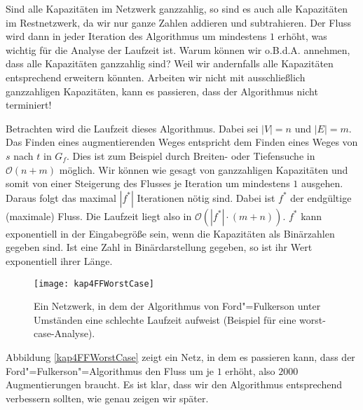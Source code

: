 Sind alle Kapazitäten im Netzwerk ganzzahlig, so sind es auch alle Kapazitäten im Restnetzwerk, da wir nur ganze Zahlen addieren und subtrahieren. Der Fluss wird dann in jeder Iteration des Algorithmus um mindestens $1$ erhöht, was wichtig für die Analyse der Laufzeit ist. Warum können wir o.B.d.A. annehmen, dass alle Kapazitäten ganzzahlig sind? Weil wir andernfalls alle Kapazitäten entsprechend erweitern könnten. Arbeiten wir nicht mit ausschließlich ganzzahligen Kapazitäten, kann es passieren, dass der Algorithmus nicht terminiert!

Betrachten wird die Laufzeit dieses Algorithmus. Dabei sei $|V| = n$ und $|E| = m$. Das Finden eines augmentierenden Weges entspricht dem Finden eines Weges von $s$ nach $t$ in $G_f$. Dies ist zum Beispiel durch Breiten- oder Tiefensuche in $\mathcal{O}(n+m)$ möglich. Wir können wie gesagt von ganzzahligen Kapazitäten und somit von einer Steigerung des Flusses je Iteration um mindestens $1$ ausgehen. Daraus folgt das maximal $|f^*|$ Iterationen nötig sind. Dabei ist $f^*$ der endgültige (maximale) Fluss. Die Laufzeit liegt also in $\mathcal{O}(|f^*| \cdot (m+n))$. $f^*$ kann exponentiell in der Eingabegröße sein, wenn die Kapazitäten als Binärzahlen gegeben sind. Ist eine Zahl in Binärdarstellung gegeben, so ist ihr Wert exponentiell ihrer Länge.


\begin{figure}[htb]
  \centering
  \texttt{[image: kap4FFWorstCase]}
  \caption{Ein Netzwerk, in dem der Algorithmus von Ford"=Fulkerson unter Umständen eine schlechte Laufzeit aufweist (Beispiel für eine worst-case-Analyse).}
  \label{kap4FFWorstCase}
\end{figure}


Abbildung \vref{kap4FFWorstCase} zeigt ein Netz, in dem es passieren kann, dass der Ford"=Fulkerson"=Algorithmus den Fluss um je $1$ erhöht, also $2000$ Augmentierungen braucht. Es ist klar, dass wir den Algorithmus entsprechend verbessern sollten, wie genau zeigen wir später.

